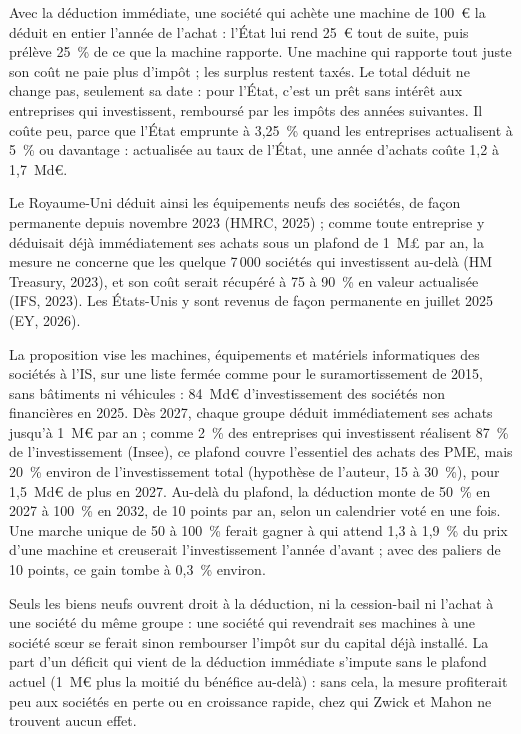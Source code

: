 Avec la déduction immédiate, une société qui achète une machine de 100~€ la déduit en entier l'année de l'achat :
l'État lui rend 25~€ tout de suite, puis prélève 25~\% de ce que la machine rapporte. Une machine qui rapporte tout
juste son coût ne paie plus d'impôt ; les surplus restent taxés. Le total déduit ne change pas, seulement sa date :
pour l'État, c'est un prêt sans intérêt aux entreprises qui investissent, remboursé par les impôts des années
suivantes. Il coûte peu, parce que l'État emprunte à 3,25~\% quand les entreprises actualisent à 5~\% ou davantage :
actualisée au taux de l'État, une année d'achats coûte 1,2 à 1,7~Md€.

Le Royaume-Uni déduit ainsi les équipements neufs des sociétés, de façon permanente depuis novembre 2023 (HMRC, 2025) ;
comme toute entreprise y déduisait déjà immédiatement ses achats sous un plafond de 1~M£ par an, la mesure ne concerne
que les quelque 7\,000 sociétés qui investissent au-delà (HM Treasury, 2023), et son coût serait récupéré à 75 à
90~\% en valeur actualisée (IFS, 2023). Les États-Unis y sont revenus de façon permanente en juillet 2025 (EY, 2026).

La proposition vise les machines, équipements et matériels informatiques des sociétés à l'IS, sur une liste fermée
comme pour le suramortissement de 2015, sans bâtiments ni véhicules : 84~Md€ d'investissement des sociétés non
financières en 2025. Dès 2027, chaque groupe déduit immédiatement ses achats jusqu'à 1~M€ par an ; comme 2~\% des
entreprises qui investissent réalisent 87~\% de l'investissement (Insee), ce plafond couvre l'essentiel des achats des
PME, mais 20~\% environ de l'investissement total (hypothèse de l'auteur, 15 à 30~\%), pour 1,5~Md€ de plus en 2027.
Au-delà du plafond, la déduction monte de 50~\% en 2027 à 100~\% en 2032, de 10 points par an, selon un calendrier voté
en une fois. Une marche unique de 50 à 100~\% ferait gagner à qui attend 1,3 à 1,9~\% du prix d'une machine et
creuserait l'investissement l'année d'avant ; avec des paliers de 10 points, ce gain tombe à 0,3~\% environ.

Seuls les biens neufs ouvrent droit à la déduction, ni la cession-bail ni l'achat à une société du même groupe : une
société qui revendrait ses machines à une société sœur se ferait sinon rembourser l'impôt sur du capital déjà
installé. La part d'un déficit qui vient de la déduction immédiate s'impute sans le
plafond actuel (1~M€ plus la moitié du bénéfice au-delà) : sans cela, la mesure profiterait peu aux sociétés en perte
ou en croissance rapide, chez qui Zwick et Mahon ne trouvent aucun effet.

